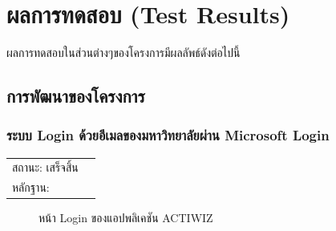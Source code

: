 \documentclass[14pt,oneside,openright,a4paper]{cpe-thai-project}
\begin{document}
\newpage

\section{ผลการทดสอบ (Test Results)}
ผลการทดสอบในส่วนต่างๆของโครงการมีผลลัพธ์ดังต่อไปนี้
\subsection{การพัฒนาของโครงการ}
\subsubsection{ระบบ Login ด้วยอีเมลของมหาวิทยาลัยผ่าน Microsoft Login}
\begin{tabular}{@{}p{2cm}p{10cm}@{}}
  สถานะ: เสร็จสิ้น \\
  หลักฐาน: & \\
  \end{tabular}
\begin{figure}[!h]\centering
  \setlength{\fboxrule}{0.5mm} %
  \setlength{\fboxsep}{0.5cm}
  \caption{หน้า Login ของแอปพลิเคชัน ACTIWIZ}\label{fig:LoginPage}
\end{figure}
\end{document}
